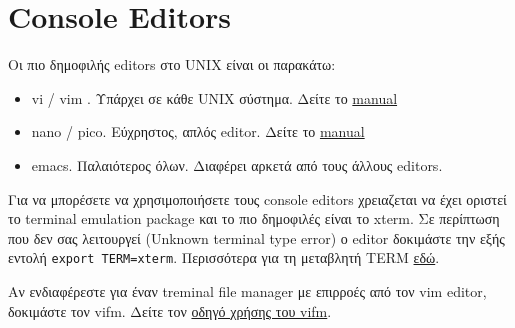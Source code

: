 







\section{Console Editors}
Οι πιο δημοφιλής editors στο UNIX είναι οι παρακάτω:
\begin{itemize}
	\item vi / vim \cite{Neil:2015}. Υπάρχει σε κάθε UNIX σύστημα. Δείτε το \href{https://www.cs.colostate.edu/helpdocs/vi.html}{manual}
	\item nano / pico. Εύχρηστος, απλός editor. Δείτε το \href{http://documentation.its.umich.edu/node/241}{manual}
	\item emacs. Παλαιότερος όλων. Διαφέρει αρκετά από τους άλλους editors.
\end{itemize}

Για να μπορέσετε να χρησιμοποιήσετε τους console editors χρειαζεται να έχει οριστεί το terminal emulation package και το πιο δημοφιλές είναι το xterm. Σε περίπτωση που δεν σας λειτουργεί (Unknown terminal type error) ο editor δοκιμάστε την εξής εντολή \texttt{export TERM=xterm}. Περισσότερα για τη μεταβλητή TERM  \href{http://jdebp.eu./Softwares/nosh/guide/TERM.html}{εδώ}.

\begin{tcolorbox}[frogbox, title=vifm]
	Αν ενδιαφέρεστε για έναν treminal file manager με επιρροές από τον vim editor, δοκιμάστε τον vifm. Δείτε τον  \href{https://wiki.vifm.info/index.php/Quickstart_Tutorial}{οδηγό χρήσης του vifm}.
\end{tcolorbox}


